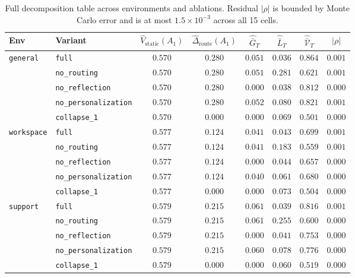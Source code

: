 \documentclass{article} %
\begin{document}
\begin{table}[h]
\centering
\small
\setlength{\tabcolsep}{4pt}
\begin{tabular}{llcccccc}
\toprule
Env & Variant & $\widehat V_{\mathrm{static}}(A_1)$ & $\widehat\Delta_{\mathrm{route}}(A_1)$ & $\widehat{\bar G}_T$ & $\widehat{\bar L}_T$ & $\widehat{\bar{\mathcal V}}_T$ & $|\rho|$ \\
\midrule
\multirow{5}{*}{\texttt{general}}
 & \texttt{full}                & $0.570$ & $0.280$ & $0.051$ & $0.036$ & $0.864$ & $0.001$ \\
 & \texttt{no\_routing}         & $0.570$ & $0.280$ & $0.051$ & $0.281$ & $0.621$ & $0.001$ \\
 & \texttt{no\_reflection}      & $0.570$ & $0.280$ & $0.000$ & $0.038$ & $0.812$ & $0.000$ \\
 & \texttt{no\_personalization} & $0.570$ & $0.280$ & $0.052$ & $0.080$ & $0.821$ & $0.001$ \\
 & \texttt{collapse\_1}         & $0.570$ & $0.000$ & $0.000$ & $0.069$ & $0.501$ & $0.000$ \\
\midrule
\multirow{5}{*}{\texttt{workspace}}
 & \texttt{full}                & $0.577$ & $0.124$ & $0.041$ & $0.043$ & $0.699$ & $0.001$ \\
 & \texttt{no\_routing}         & $0.577$ & $0.124$ & $0.041$ & $0.183$ & $0.559$ & $0.001$ \\
 & \texttt{no\_reflection}      & $0.577$ & $0.124$ & $0.000$ & $0.044$ & $0.657$ & $0.000$ \\
 & \texttt{no\_personalization} & $0.577$ & $0.124$ & $0.040$ & $0.061$ & $0.680$ & $0.000$ \\
 & \texttt{collapse\_1}         & $0.577$ & $0.000$ & $0.000$ & $0.073$ & $0.504$ & $0.000$ \\
\midrule
\multirow{5}{*}{\texttt{support}}
 & \texttt{full}                & $0.579$ & $0.215$ & $0.061$ & $0.039$ & $0.816$ & $0.001$ \\
 & \texttt{no\_routing}         & $0.579$ & $0.215$ & $0.061$ & $0.255$ & $0.600$ & $0.000$ \\
 & \texttt{no\_reflection}      & $0.579$ & $0.215$ & $0.000$ & $0.041$ & $0.753$ & $0.000$ \\
 & \texttt{no\_personalization} & $0.579$ & $0.215$ & $0.060$ & $0.078$ & $0.776$ & $0.000$ \\
 & \texttt{collapse\_1}         & $0.579$ & $0.000$ & $0.000$ & $0.060$ & $0.519$ & $0.000$ \\
\bottomrule
\end{tabular}
\caption{Full decomposition table across environments and ablations. Residual $|\rho|$ is bounded by Monte Carlo error and is at most $1.5\times 10^{-3}$ across all 15 cells.}
\label{tab:app-decomp-full}
\end{table}
\end{document}
